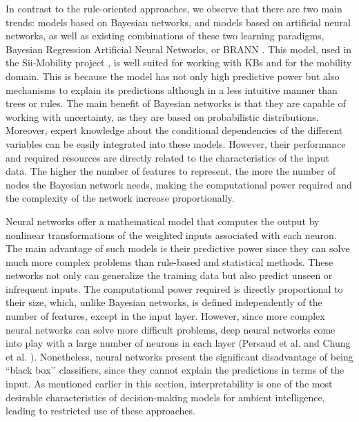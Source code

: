 
In contrast to the rule-oriented approaches, we observe that there are two main trends: models based on Bayesian networks, and models based on artificial neural networks, as well as existing combinations of these two learning paradigms, Bayesian Regression Artificial Neural Networks, or BRANN \citep{brann1,brann2,brann3}. This model, used in the Sii-Mobility project \citep{siimobility-parking}, is well suited for working with KBs and for the mobility domain. This is because the model has not only high predictive power but also mechanisms to explain its predictions although in a less intuitive manner than trees or rules. The main benefit of Bayesian networks is that they are capable of working with uncertainty, as they are based on probabilistic distributions. Moreover, expert knowledge about the conditional dependencies of the different variables can be easily integrated into these models. However, their performance and required resources are directly related to the characteristics of the input data. The higher the number of features to represent, the more the number of nodes the Bayesian network needs, making the computational power required and the complexity of the network increase proportionally. 

Neural networks offer a mathematical model that computes the output by nonlinear transformations of the weighted inputs associated with each neuron. The main advantage of such models is their predictive power since they can solve much more complex problems than rule-based and statistical methods. These networks not only can generalize the training data but also predict unseen or infrequent inputs. The computational power required is directly proportional to their size, which, unlike Bayesian networks, is defined independently of the number of features, except in the input layer.  However, since more complex neural networks can solve more difficult problems, deep neural networks come into play with a large number of neurons in each layer (Persaud et al. \citep{persaudetal} and Chung et al. \citep{chungetal2018}).  Nonetheless, neural networks present the significant disadvantage of being ``black box’’ classifiers, since they cannot explain the predictions in terms of the input. As mentioned earlier in this section, interpretability is one of the most desirable characteristics of decision-making models for ambient intelligence, leading to restricted use of these approaches.

